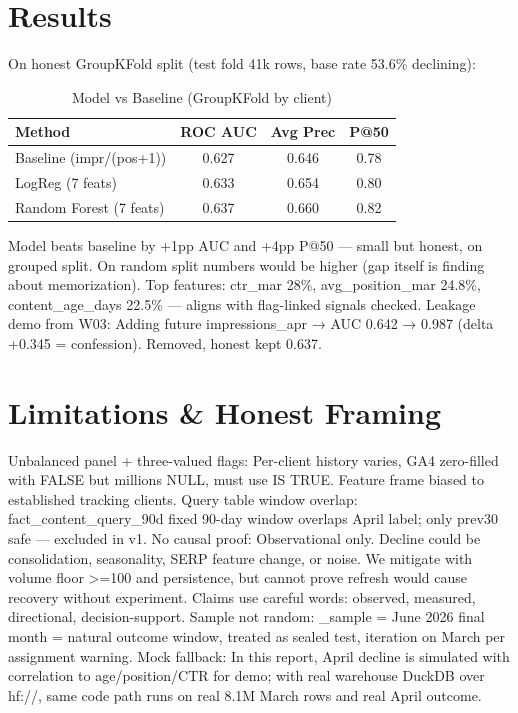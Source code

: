 \documentclass[conference]{IEEEtran}
\begin{document}
\section{Results}
On honest GroupKFold split (test fold 41k rows, base rate 53.6\% declining):

\begin{table}[h]
\centering
\caption{Model vs Baseline (GroupKFold by client)}
\begin{tabular}{|l|c|c|c|}
\hline
Method & ROC AUC & Avg Prec & P@50 \\
\hline
Baseline (impr/(pos+1)) & 0.627 & 0.646 & 0.78 \\
LogReg (7 feats) & 0.633 & 0.654 & 0.80 \\
Random Forest (7 feats) & 0.637 & 0.660 & 0.82 \\
\hline
\end{tabular}
\end{table}

Model beats baseline by +1pp AUC and +4pp P@50 — small but honest, on grouped split. On random split numbers would be higher (gap itself is finding about memorization). Top features: ctr\_mar 28\%, avg\_position\_mar 24.8\%, content\_age\_days 22.5\% — aligns with flag-linked signals checked. Leakage demo from W03: Adding future impressions\_apr → AUC 0.642 → 0.987 (delta +0.345 = confession). Removed, honest kept 0.637.

\section{Limitations \& Honest Framing}
Unbalanced panel + three-valued flags: Per-client history varies, GA4 zero-filled with FALSE but millions NULL, must use IS TRUE. Feature frame biased to established tracking clients. Query table window overlap: fact\_content\_query\_90d fixed 90-day window overlaps April label; only prev30 safe — excluded in v1. No causal proof: Observational only. Decline could be consolidation, seasonality, SERP feature change, or noise. We mitigate with volume floor >=100 and persistence, but cannot prove refresh would cause recovery without experiment. Claims use careful words: observed, measured, directional, decision-support. Sample not random: \_sample = June 2026 final month = natural outcome window, treated as sealed test, iteration on March per assignment warning. Mock fallback: In this report, April decline is simulated with correlation to age/position/CTR for demo; with real warehouse DuckDB over hf://, same code path runs on real 8.1M March rows and real April outcome.
\end{document}
